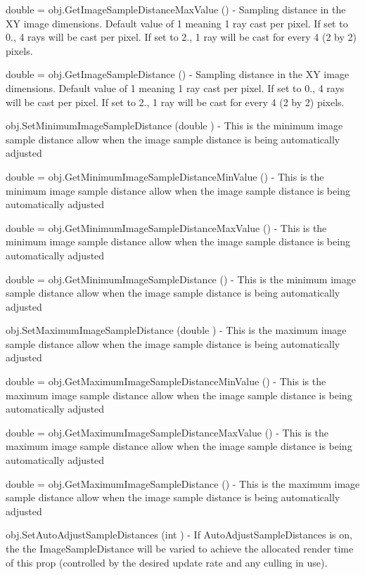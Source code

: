 \begin{DoxyItemize}
\item {\ttfamily double = obj.\-Get\-Image\-Sample\-Distance\-Max\-Value ()} -\/ Sampling distance in the X\-Y image dimensions. Default value of 1 meaning 1 ray cast per pixel. If set to 0., 4 rays will be cast per pixel. If set to 2., 1 ray will be cast for every 4 (2 by 2) pixels.  
\item {\ttfamily double = obj.\-Get\-Image\-Sample\-Distance ()} -\/ Sampling distance in the X\-Y image dimensions. Default value of 1 meaning 1 ray cast per pixel. If set to 0., 4 rays will be cast per pixel. If set to 2., 1 ray will be cast for every 4 (2 by 2) pixels.  
\item {\ttfamily obj.\-Set\-Minimum\-Image\-Sample\-Distance (double )} -\/ This is the minimum image sample distance allow when the image sample distance is being automatically adjusted  
\item {\ttfamily double = obj.\-Get\-Minimum\-Image\-Sample\-Distance\-Min\-Value ()} -\/ This is the minimum image sample distance allow when the image sample distance is being automatically adjusted  
\item {\ttfamily double = obj.\-Get\-Minimum\-Image\-Sample\-Distance\-Max\-Value ()} -\/ This is the minimum image sample distance allow when the image sample distance is being automatically adjusted  
\item {\ttfamily double = obj.\-Get\-Minimum\-Image\-Sample\-Distance ()} -\/ This is the minimum image sample distance allow when the image sample distance is being automatically adjusted  
\item {\ttfamily obj.\-Set\-Maximum\-Image\-Sample\-Distance (double )} -\/ This is the maximum image sample distance allow when the image sample distance is being automatically adjusted  
\item {\ttfamily double = obj.\-Get\-Maximum\-Image\-Sample\-Distance\-Min\-Value ()} -\/ This is the maximum image sample distance allow when the image sample distance is being automatically adjusted  
\item {\ttfamily double = obj.\-Get\-Maximum\-Image\-Sample\-Distance\-Max\-Value ()} -\/ This is the maximum image sample distance allow when the image sample distance is being automatically adjusted  
\item {\ttfamily double = obj.\-Get\-Maximum\-Image\-Sample\-Distance ()} -\/ This is the maximum image sample distance allow when the image sample distance is being automatically adjusted  
\item {\ttfamily obj.\-Set\-Auto\-Adjust\-Sample\-Distances (int )} -\/ If Auto\-Adjust\-Sample\-Distances is on, the the Image\-Sample\-Distance will be varied to achieve the allocated render time of this prop (controlled by the desired update rate and any culling in use).  

\end{DoxyItemize}
